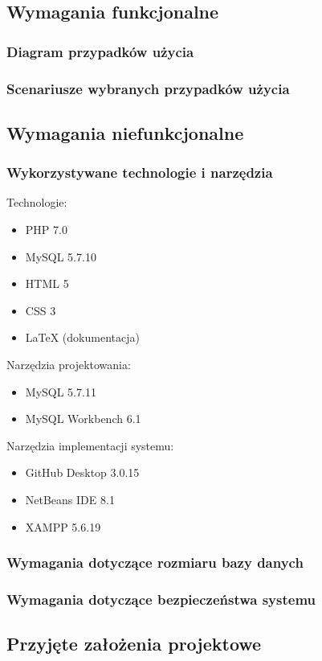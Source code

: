 \documentclass[a4paper, 12pt]{article}
\begin{document}
\subsection{Wymagania funkcjonalne}
\subsubsection{Diagram przypadków użycia}
\subsubsection{Scenariusze wybranych przypadków użycia}

\subsection{Wymagania niefunkcjonalne}
\subsubsection{Wykorzystywane technologie i narzędzia}
Technologie:
\begin{itemize}
	\item PHP 7.0
	\item MySQL 5.7.10
	\item HTML 5
	\item CSS 3
	\item LaTeX (dokumentacja)
\end{itemize}
Narzędzia projektowania:
\begin{itemize}
	\item MySQL 5.7.11
	\item MySQL Workbench 6.1
\end{itemize}
Narzędzia implementacji systemu:
\begin{itemize}
	\item GitHub Desktop 3.0.15
	\item NetBeans IDE 8.1
	\item XAMPP 5.6.19
\end{itemize}
\subsubsection{Wymagania dotyczące rozmiaru bazy danych}
\subsubsection{Wymagania dotyczące bezpieczeństwa systemu}
\subsection{Przyjęte założenia projektowe}
\end{document}
